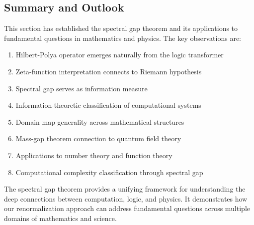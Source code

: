 \subsection{Summary and Outlook}

This section has established the spectral gap theorem and its applications to fundamental questions in mathematics and physics. The key observations are:

\begin{enumerate}
\item Hilbert-Polya operator emerges naturally from the logic transformer
\item Zeta-function interpretation connects to Riemann hypothesis
\item Spectral gap serves as information measure
\item Information-theoretic classification of computational systems
\item Domain map generality across mathematical structures
\item Mass-gap theorem connection to quantum field theory
\item Applications to number theory and function theory
\item Computational complexity classification through spectral gap
\end{enumerate}

The spectral gap theorem provides a unifying framework for understanding the deep connections between computation, logic, and physics. It demonstrates how our renormalization approach can address fundamental questions across multiple domains of mathematics and science.